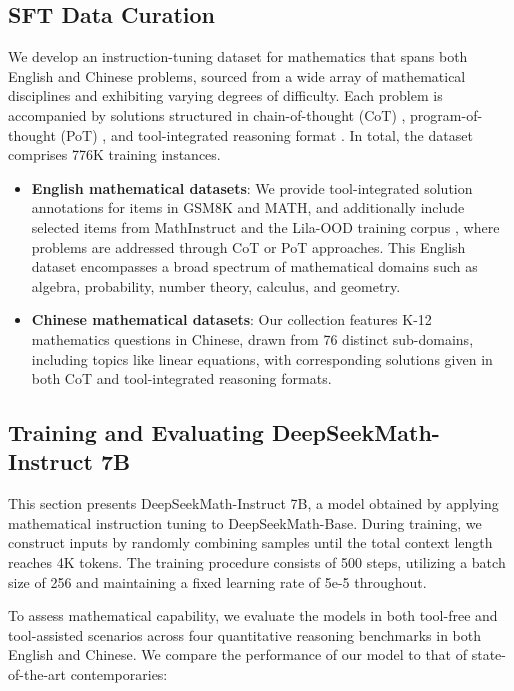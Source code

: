 \begin{itemize}[topsep=0pt]
\begin{itemize}[topsep=0pt]
\subsection{SFT Data Curation}

We develop an instruction-tuning dataset for mathematics that spans both English and Chinese problems, sourced from a wide array of mathematical disciplines and exhibiting varying degrees of difficulty. Each problem is accompanied by solutions structured in chain-of-thought (CoT) \citep{cot}, program-of-thought (PoT) \citep{pot,pal}, and tool-integrated reasoning format \citep{tora}. In total, the dataset comprises 776K training instances.

\begin{itemize}[topsep=0pt]
    \item \textbf{English mathematical datasets}: We provide tool-integrated solution annotations for items in GSM8K and MATH, and additionally include selected items from MathInstruct \citep{MathInstruct} and the Lila-OOD training corpus \citep{lila}, where problems are addressed through CoT or PoT approaches. This English dataset encompasses a broad spectrum of mathematical domains such as algebra, probability, number theory, calculus, and geometry.
    \item \textbf{Chinese mathematical datasets}: Our collection features K-12 mathematics questions in Chinese, drawn from 76 distinct sub-domains, including topics like linear equations, with corresponding solutions given in both CoT and tool-integrated reasoning formats.
\end{itemize}

\subsection{Training and Evaluating DeepSeekMath-Instruct 7B}

This section presents DeepSeekMath-Instruct 7B, a model obtained by applying mathematical instruction tuning to DeepSeekMath-Base. During training, we construct inputs by randomly combining samples until the total context length reaches 4K tokens. The training procedure consists of 500 steps, utilizing a batch size of 256 and maintaining a fixed learning rate of 5e-5 throughout.

To assess mathematical capability, we evaluate the models in both tool-free and tool-assisted scenarios across four quantitative reasoning benchmarks in both English and Chinese. We compare the performance of our model to that of state-of-the-art contemporaries:


\end{itemize}
\end{itemize}
